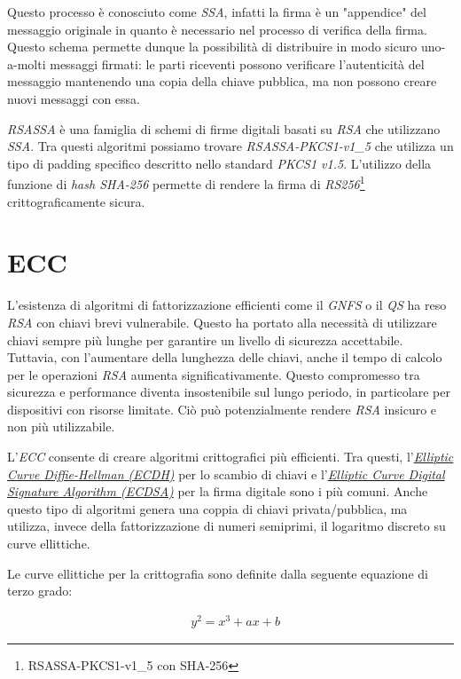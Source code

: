 Questo processo è conosciuto come \emph{\gls{SSA}}, infatti la firma è un "appendice" del messaggio originale in quanto è necessario nel processo di verifica della firma.
Questo schema permette dunque la possibilità di distribuire in modo sicuro uno-a-molti messaggi firmati: le parti riceventi possono verificare l'autenticità del messaggio mantenendo una copia della chiave pubblica, ma non possono creare nuovi messaggi con essa.

\emph{RSASSA} è una famiglia di schemi di firme digitali basati su \emph{RSA} che utilizzano \emph{SSA}.
Tra questi algoritmi possiamo trovare \emph{RSASSA-PKCS1-v1\_5} che utilizza un tipo di padding specifico descritto nello standard \emph{\gls{PKCS1} v1.5}.
L'utilizzo della funzione di \emph{hash SHA-256} permette di rendere la firma di \emph{RS256}\footnote{RSASSA-PKCS1-v1\_5 con SHA-256} crittograficamente sicura.

\section{ECC}
L'esistenza di algoritmi di fattorizzazione efficienti come il \emph{\gls{GNFS}} o il \emph{\gls{QS}} ha reso \emph{RSA} con chiavi brevi vulnerabile.
Questo ha portato alla necessità di utilizzare chiavi sempre più lunghe per garantire un livello di sicurezza accettabile.
Tuttavia, con l'aumentare della lunghezza delle chiavi, anche il tempo di calcolo per le operazioni \emph{RSA} aumenta significativamente.
Questo compromesso tra sicurezza e performance diventa insostenibile sul lungo periodo, in particolare per dispositivi con risorse limitate.
Ciò può potenzialmente rendere \emph{RSA} insicuro e non più utilizzabile.

L'\emph{ECC} consente di creare algoritmi crittografici più efficienti.
Tra questi, l'\emph{\hyperref[sec:ecdh]{Elliptic Curve Diffie-Hellman (ECDH)}} per lo scambio di chiavi e l'\emph{\hyperref[sec:ecdsa]{Elliptic Curve Digital Signature Algorithm (ECDSA)}} per la firma digitale sono i più comuni.
Anche questo tipo di algoritmi genera una coppia di chiavi privata/pubblica, ma utilizza, invece della fattorizzazione di numeri semiprimi, il logaritmo discreto su curve ellittiche.

\noindent Le curve ellittiche per la crittografia sono definite dalla seguente equazione di terzo grado:

\begin{equation}
	\begin{aligned}
		&y^2 = x^3 + ax + b
	\end{aligned}
\end{equation}

